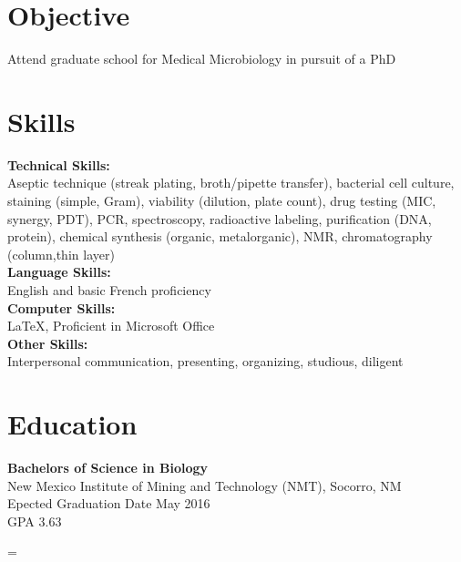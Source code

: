 \documentclass[margin]{res}
\newenvironment{nobreaker}
{\par\nobreak\vfil\penalty0\vfilneg\vtop\bgroup}
{\par\xdef\tpd{\the\prevdepth}\egroup\prevdepth=\tpd}
\begin{document}
 
  \begin{nobreaker}
 
\address{1007 Leroy Pl \\ Socorro, NM 87801  \\
        kzingler@nmt.edu \\ kvzvanwhy.me}


 
\begin{resume} 

\section{Objective} 
Attend graduate school for Medical Microbiology in pursuit of a PhD

\section{Skills} 
\begin{multicols}{2}
	{\bf Technical Skills:}\\
 	Aseptic technique (streak plating, broth/pipette transfer), bacterial cell culture, staining (simple, Gram), viability (dilution, plate count), drug testing (MIC, synergy, PDT), PCR, spectroscopy, radioactive labeling, purification (DNA, protein), chemical synthesis (organic, metalorganic), NMR, chromatography (column,thin layer) \\
 	{\bf Language Skills:}\\
 	 English and basic French proficiency \\
 	 {\bf Computer Skills:}\\
         \LaTeX, Proficient in Microsoft Office \\
 	{\bf Other Skills:}\\
 	Interpersonal communication, presenting, organizing, studious, diligent\\ 	
\end{multicols}


\section{Education} 
 {\bf Bachelors of Science in Biology}\\
 New Mexico Institute of Mining and Technology (NMT), Socorro, NM\\
 Epected Graduation Date May 2016 \\
GPA 3.63 



\end{resume}
\end{nobreaker}
\end{document}
